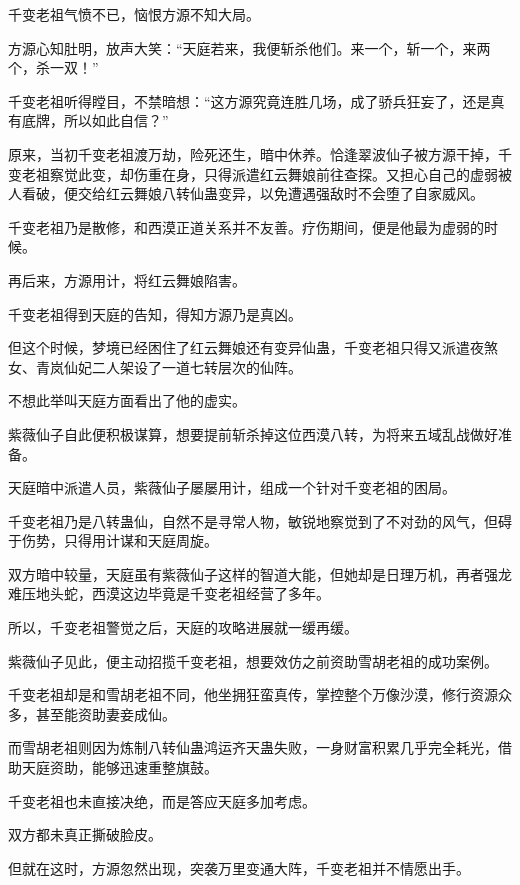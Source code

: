 
\begin{this_body}



千变老祖气愤不已，恼恨方源不知大局。

方源心知肚明，放声大笑：“天庭若来，我便斩杀他们。来一个，斩一个，来两个，杀一双！”

千变老祖听得瞠目，不禁暗想：“这方源究竟连胜几场，成了骄兵狂妄了，还是真有底牌，所以如此自信？”

原来，当初千变老祖渡万劫，险死还生，暗中休养。恰逢翠波仙子被方源干掉，千变老祖察觉此变，却伤重在身，只得派遣红云舞娘前往查探。又担心自己的虚弱被人看破，便交给红云舞娘八转仙蛊变异，以免遭遇强敌时不会堕了自家威风。

千变老祖乃是散修，和西漠正道关系并不友善。疗伤期间，便是他最为虚弱的时候。

再后来，方源用计，将红云舞娘陷害。

千变老祖得到天庭的告知，得知方源乃是真凶。

但这个时候，梦境已经困住了红云舞娘还有变异仙蛊，千变老祖只得又派遣夜煞女、青岚仙妃二人架设了一道七转层次的仙阵。

不想此举叫天庭方面看出了他的虚实。

紫薇仙子自此便积极谋算，想要提前斩杀掉这位西漠八转，为将来五域乱战做好准备。

天庭暗中派遣人员，紫薇仙子屡屡用计，组成一个针对千变老祖的困局。

千变老祖乃是八转蛊仙，自然不是寻常人物，敏锐地察觉到了不对劲的风气，但碍于伤势，只得用计谋和天庭周旋。

双方暗中较量，天庭虽有紫薇仙子这样的智道大能，但她却是日理万机，再者强龙难压地头蛇，西漠这边毕竟是千变老祖经营了多年。

所以，千变老祖警觉之后，天庭的攻略进展就一缓再缓。

紫薇仙子见此，便主动招揽千变老祖，想要效仿之前资助雪胡老祖的成功案例。

千变老祖却是和雪胡老祖不同，他坐拥狂蛮真传，掌控整个万像沙漠，修行资源众多，甚至能资助妻妾成仙。

而雪胡老祖则因为炼制八转仙蛊鸿运齐天蛊失败，一身财富积累几乎完全耗光，借助天庭资助，能够迅速重整旗鼓。

千变老祖也未直接决绝，而是答应天庭多加考虑。

双方都未真正撕破脸皮。

但就在这时，方源忽然出现，突袭万里变通大阵，千变老祖并不情愿出手。


\end{this_body}
